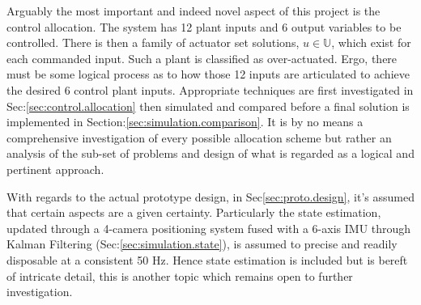 \par
Arguably the most important and indeed novel aspect of this project is the control allocation. The system has 12 plant inputs and 6 output variables to be controlled. There is then a family of actuator set solutions, $u\in\mathbb{U}$, which exist for each commanded input. Such a plant is classified as over-actuated. Ergo, there must be some logical process as to how those 12 inputs are articulated to achieve the desired 6 control plant inputs. Appropriate techniques are first investigated in Sec:\ref{sec:control.allocation} then simulated and compared before a final solution is implemented in Section:\ref{sec:simulation.comparison}. It is by no means a comprehensive investigation of every possible allocation scheme but rather an analysis of the sub-set of problems and design of what is regarded as a logical and pertinent approach.
\par
With regards to the actual prototype design, in Sec\ref{sec:proto.design}, it's assumed that certain aspects are a given certainty. Particularly the state estimation, updated through a 4-camera positioning system fused with a 6-axis IMU through Kalman Filtering (Sec:\ref{sec:simulation.state}), is assumed to precise and readily disposable at a consistent 50 Hz. Hence state estimation is included but is bereft of intricate detail, this is another topic which remains open to further investigation.
